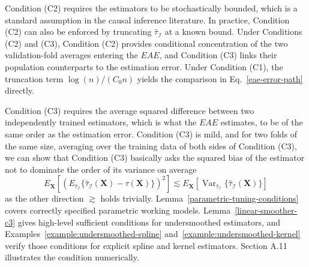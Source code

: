 \documentclass[11pt]{article}
\theoremstyle{referenceplain}
\theoremstyle{referencedefinition}
\theoremstyle{referenceremark}
\begin{document}
Condition (C2) requires the estimators to be stochastically bounded, which is a standard assumption in the causal inference literature. In practice, Condition (C2) can also be enforced by truncating $\widehat\tau_{\mathcal I}$ at a known bound. Under Conditions (C2) and (C3), Condition (C2) provides conditional concentration of the two validation-fold averages entering the $EAE$, and Condition (C3) links their population counterparts to the estimation error. Under Condition (C1), the truncation term $\log(n)/({C_0}n)$ yields the comparison in Eq.~\eqref{eae-error-path} directly.

Condition (C3) requires the average squared difference between two independently trained estimators, which is what the $EAE$ estimates, to be of the same order as the estimation error. Condition (C3) is mild, and for two folds of the same size, averaging over the training data of both sides of Condition (C3), we can show that Condition (C3) basically asks the squared bias of the estimator not to dominate the order of its variance on average
\[
E_{\mathbf X}\left[\left(E_{\widehat\tau_{\mathcal I}}\{\widehat\tau_{\mathcal I}(\mathbf X)-\tau(\mathbf X)\}\right)^2\right]
\lesssim
E_{\mathbf X}\left[\operatorname{Var}_{\widehat\tau_{\mathcal I}}\{\widehat\tau_{\mathcal I}(\mathbf X)\}\right]
\]
as the other direction $\gtrsim$ holds trivially. Lemma~\ref{parametric-tuning-conditions} covers correctly specified parametric working models. Lemma~\ref{linear-smoother-c3} gives high-level sufficient conditions for undersmoothed estimators, and Examples~\ref{example:undersmoothed-spline} and~\ref{example:undersmoothed-kernel} verify those conditions for explicit spline and kernel estimators. Section A.11 illustrates the condition numerically.
\end{document}
